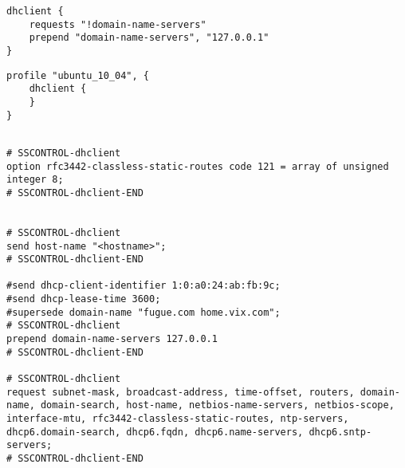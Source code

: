
\begin{lstlisting}[style=Java,label=lst:dhclient_example_script,
title={Example script for the Dhclient service. It will remove the domain name servers from the DHCP request and use the DNS server on the localhost.}]
dhclient {
    requests "!domain-name-servers"
    prepend "domain-name-servers", "127.0.0.1"
}
\end{lstlisting}

\begin{lstlisting}[style=Java,label=lst:dhclient_ubuntu_profile_min,
title={Minimal Ubuntu Dhclient profile, all needed profile properties are already set to sensible default values.}]
profile "ubuntu_10_04", {
    dhclient {
    }
}
\end{lstlisting}

\begin{lstlisting}[style=rcfile_nonumbers,
label=lst:dhclient_maincf_example,
title={Example of the DHCP configuration file that is created from the Dhclient profile.
The file is saved as /etc/dhcp3/dhclient.conf}]

# SSCONTROL-dhclient
option rfc3442-classless-static-routes code 121 = array of unsigned integer 8;
# SSCONTROL-dhclient-END


# SSCONTROL-dhclient
send host-name "<hostname>";
# SSCONTROL-dhclient-END

#send dhcp-client-identifier 1:0:a0:24:ab:fb:9c;
#send dhcp-lease-time 3600;
#supersede domain-name "fugue.com home.vix.com";
# SSCONTROL-dhclient
prepend domain-name-servers 127.0.0.1
# SSCONTROL-dhclient-END

# SSCONTROL-dhclient
request subnet-mask, broadcast-address, time-offset, routers, domain-name, domain-search, host-name, netbios-name-servers, netbios-scope, interface-mtu, rfc3442-classless-static-routes, ntp-servers, dhcp6.domain-search, dhcp6.fqdn, dhcp6.name-servers, dhcp6.sntp-servers;
# SSCONTROL-dhclient-END

\end{lstlisting}

